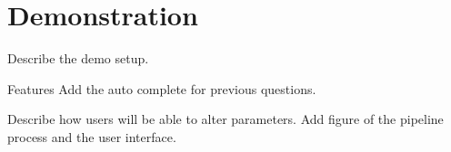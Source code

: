 
\section{Demonstration}

Describe the demo setup. 

Features
  Add the auto complete for previous questions.

Describe how users will be able to alter parameters.
Add figure of the pipeline process and the user interface.
